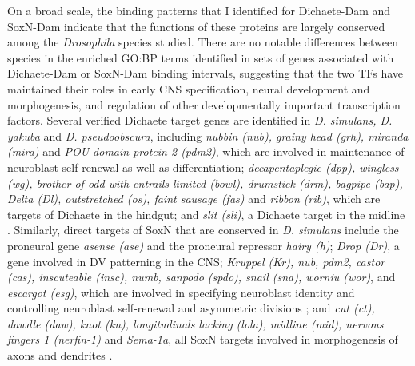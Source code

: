 On a broad scale, the binding patterns that I identified for Dichaete-Dam and SoxN-Dam indicate that the functions of these proteins are largely conserved among the \emph{Drosophila} species studied. There are no notable differences between species in the enriched GO:BP terms identified in sets of genes associated with Dichaete-Dam or SoxN-Dam binding intervals, suggesting that the two TFs have maintained their roles in early CNS specification, neural development and morphogenesis, and regulation of other developmentally important transcription factors. Several verified Dichaete target genes are identified in \emph{D. simulans, D. yakuba} and \emph{D. pseudoobscura}, including \emph{nubbin (nub), grainy head (grh), miranda (mira)} and \emph{POU domain protein 2 (pdm2)}, which are involved in maintenance of neuroblast self-renewal as well as differentiation; \emph{decapentaplegic (dpp), wingless (wg), brother of odd with entrails limited (bowl), drumstick (drm), bagpipe (bap), Delta (Dl), outstretched (os), faint sausage (fas)} and \emph{ribbon (rib)}, which are targets of Dichaete in the hindgut; and \emph{slit (sli)}, a Dichaete target in the midline \citep{aleksic_role_2013}. Similarly, direct targets of SoxN that are conserved in \emph{D. simulans} include the proneural gene \emph{asense (ase)} and the proneural repressor \emph{hairy (h)}; \emph{Drop (Dr)}, a gene involved in DV patterning in the CNS; \emph{Kruppel (Kr), nub, pdm2, castor (cas), inscuteable (insc), numb, sanpodo (spdo), snail (sna), worniu (wor)}, and \emph{escargot (esg)}, which are involved in specifying neuroblast identity and controlling neuroblast self-renewal and asymmetric divisions \citep{buescher_binary_1998,cai_family_2001,isshiki_drosophila_2001,kraut_role_1996,maurange_brainy_2005,oconnor-giles_numb_????,skeath_sanpodo_1998,van_doren_negative_1994}; and \emph{cut (ct), dawdle (daw), knot (kn), longitudinals lacking (lola), midline (mid), nervous fingers 1 (nerfin-1)} and \emph{Sema-1a}, all SoxN targets involved in morphogenesis of axons and dendrites \citep{ferrero_soxneuro_2014,giniger_lola_1994,jinushi-nakao_knot/collier_????,kuzin_nerfin-1_2005,liu_midline_2009,parker_divergent_2006,yu_transmembrane_????}.\\

